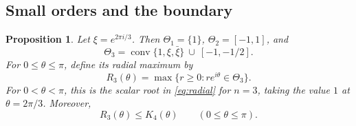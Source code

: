 \documentclass[11pt,a4paper]{article}
\newtheorem{proposition}[theorem]{Proposition}
\theoremstyle{definition}
\theoremstyle{remark}
\numberwithin{equation}{section}
\begin{document}
\subsection{Small orders and the boundary}
\begin{proposition}\label{prop:low-orders}
Let $\xi=e^{2\pi i/3}$. Then $\Theta_1=\{1\}$, $\Theta_2=[-1,1]$, and
\begin{equation}\label{eq:order-three}
 \Theta_3=\operatorname{conv}\{1,\xi,\bar\xi\}\ \cup\ [-1,-1/2].
\end{equation}
For $0\le\theta\le\pi$, define its radial maximum by
\[
 R_3(\theta)=\max\{r\ge0:re^{i\theta}\in\Theta_3\}.
\]
For $0<\theta<\pi$, this is the scalar root in \eqref{eq:radial} for $n=3$, taking the value $1$ at $\theta=2\pi/3$. Moreover,
\[
 R_3(\theta)\le K_4(\theta)\qquad(0\le\theta\le\pi).
\]
\end{proposition}
\end{document}
